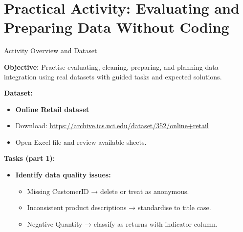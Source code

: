 \documentclass[aspectratio=169, table]{beamer}
\begin{document}
\section{Practical Activity: Evaluating and Preparing Data Without Coding}

\begin{frame}{Activity Overview and Dataset}
	\vspace{20pt}
	
	\textbf{Objective:} Practise evaluating, cleaning, preparing, and planning data integration using real datasets with guided tasks and expected solutions.
	
	\textbf{Dataset:}
	\begin{itemize}
		\item \textbf{Online Retail dataset}
		\item Download: \url{https://archive.ics.uci.edu/dataset/352/online+retail}
		\item Open Excel file and review available sheets.
	\end{itemize}
	
	\textbf{Tasks (part 1):}
	\begin{itemize}
		\item \textbf{Identify data quality issues:}
		\begin{itemize}
			\item Missing CustomerID → delete or treat as anonymous.
			\item Inconsistent product descriptions → standardise to title case.
			\item Negative Quantity → classify as returns with indicator column.
		\end{itemize}
	\end{itemize}
	
\end{frame}
\end{document}
